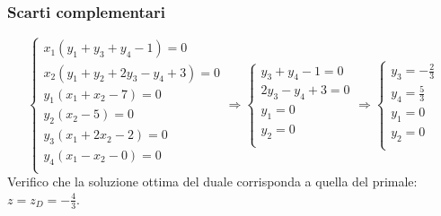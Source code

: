 \documentclass[\main/main.tex]{subfiles}
\begin{document}
\subsubsection*{Scarti complementari}
\[
  \begin{cases}
    x_1(y_1 + y_3 + y_4       - 1 )=0 \\
    x_2(y_1 + y_2 + 2y_3 -y_4 +3)=0   \\
    y_1(x_1 + x_2 - 7) = 0            \\
    y_2(x_2       - 5) = 0            \\
    y_3(x_1 + 2x_2- 2) = 0            \\
    y_4(x_1 - x_2 - 0) = 0            \\
  \end{cases}
  \Rightarrow
  \begin{cases}
    y_3 + y_4 - 1 =0 \\
    2y_3 -y_4 +3=0   \\
    y_1 = 0          \\
    y_2 = 0          \\
  \end{cases}
  \Rightarrow
  \begin{cases}
    y_3 =-\frac{2}{3} \\
    y_4=\frac{5}{3}   \\
    y_1 = 0           \\
    y_2 = 0           \\
  \end{cases}
\]
Verifico che la soluzione ottima del duale corrisponda a quella del primale: $z = z_D = -\frac{4}{3}$.
\end{document}
